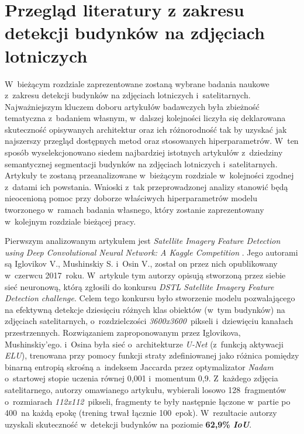 \section{Przegląd literatury z zakresu detekcji budynków na zdjęciach lotniczych}

W~bieżącym rozdziale zaprezentowane zostaną wybrane badania naukowe z~zakresu detekcji budynków na zdjęciach lotniczych i~satelitarnych. Najważniejszym kluczem doboru artykułów badawczych była zbieżność tematyczna z~badaniem własnym, w~dalszej kolejności liczyła się deklarowana skuteczność opisywanych architektur oraz ich różnorodność tak by uzyskać jak najszerszy przegląd dostępnych metod oraz stosowanych hiperparametrów. W~ten sposób wyselekcjonowano siedem najbardziej istotnych artykułów z~dziedziny semantycznej segmentacji budynków na zdjęciach lotniczych i~satelitarnych. Artykuły te zostaną przeanalizowane w~bieżącym rozdziale w~kolejności zgodnej z~datami ich powstania. Wnioski z~tak przeprowadzonej analizy stanowić będą nieocenioną pomoc przy doborze właściwych hiperparametrów modelu tworzonego w~ramach badania własnego, który zostanie zaprezentowany w~kolejnym rozdziale bieżącej pracy.

Pierwszym analizowanym artykułem jest \emph{Satellite Imagery Feature Detection using Deep Convolutional Neural Network: A Kaggle Competition} \cite{iglovikov}. Jego autorami są  Iglovikov V., Mushinskiy S. i~Osin V., został on przez nich opublikowany w~czerwcu 2017~roku. W~artykule tym autorzy opisują stworzoną przez siebie sieć neuronową, którą zgłosili do konkursu \emph{DSTL Satellite Imagery Feature Detection challenge}. Celem tego konkursu było stworzenie modelu pozwalającego na efektywną detekcje dziesięciu różnych klas obiektów (w~tym budynków) na zdjęciach satelitarnych, o~rozdzielczości \emph{3600x3600}~pikseli i~dziewięciu kanałach przestrzennych. Rozwiązaniem zaproponowanym przez Iglovikova, Mushinskiy'ego. i~Osina była sieć o~architekturze \emph{U-Net} (z~funkcją aktywacji \emph{ELU}), trenowana przy pomocy funkcji straty zdefiniowanej jako różnica pomiędzy binarną entropią skrośną a~indeksem Jaccarda przez optymalizator \emph{Nadam} o~startowej stopie uczenia równej 0,001 i~momentum 0,9. Z~każdego zdjęcia satelitarnego, autorzy omawianego artykułu, wybierali losowo 128~fragmentów o~rozmiarach \emph{112x112}~pikseli, fragmenty te były następnie łączone w~partie po 400~na każdą epokę (trening trwał łącznie 100~epok). W~rezultacie autorzy uzyskali skuteczność w~detekcji budynków na poziomie \textbf{62,9\% \emph{IoU}}.

